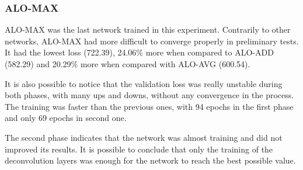 \subsubsection{ALO-MAX}
\label{ssec:bsds_subexp1_max}

ALO-MAX was the last network trained in this experiment.
Contrarily to other networks, ALO-MAX had more difficult to converge properly in preliminary tests.
It had the lowest loss (722.39), 24.06\% more when compared to ALO-ADD (582.29) and 20.29\% more when compared with ALO-AVG (600.54).



It is also possible to notice that the validation loss was really unstable during both phases, with many ups and downs, without any convergence in the process.
The training was faster than the previous ones, with 94 epochs in the first phase and only 69 epochs in second one.

The second phase indicates that the network was almost training and did not improved its results.
It is possible to conclude that only the training of the deconvolution layers was enough for the network to reach the best possible value.

